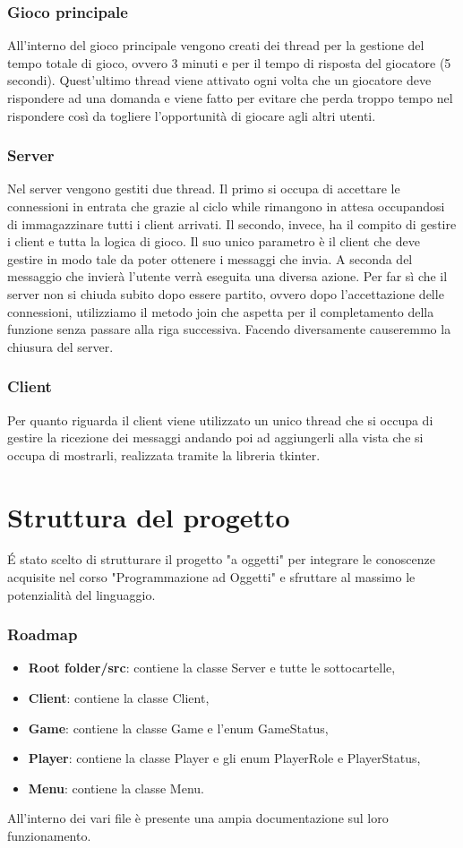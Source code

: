 \documentclass[a4paper,12pt]{report}
\begin{document}
\subsection{Gioco principale}
All'interno del gioco principale vengono creati dei thread per la gestione del tempo totale di gioco, ovvero 3 minuti e per il tempo di risposta del giocatore (5 secondi). Quest'ultimo thread viene attivato ogni volta che un giocatore deve rispondere ad una domanda e viene fatto per evitare che perda troppo tempo nel rispondere così da togliere l'opportunità di giocare agli altri utenti.

\subsection{Server}
Nel server vengono gestiti due thread. Il primo si occupa di accettare le connessioni in entrata che grazie al ciclo while rimangono in attesa occupandosi di immagazzinare tutti i client arrivati. Il secondo, invece, ha il compito di gestire i client e tutta la logica di gioco. Il suo unico parametro è il client che deve gestire in modo tale da poter ottenere i messaggi che invia. A seconda del messaggio che invierà l'utente verrà eseguita una diversa azione.
Per far sì che il server non si chiuda subito dopo essere partito, ovvero dopo l'accettazione delle connessioni, utilizziamo il metodo join che aspetta per il completamento della funzione senza passare alla riga successiva. Facendo diversamente causeremmo la chiusura del server.

\subsection{Client}
Per quanto riguarda il client viene utilizzato un unico thread che si occupa di gestire la ricezione dei messaggi andando poi ad aggiungerli alla vista che si occupa di mostrarli, realizzata tramite la libreria tkinter.

\chapter{Struttura del progetto}
É stato scelto di strutturare il progetto "a oggetti" per integrare le conoscenze acquisite nel corso "Programmazione ad Oggetti" e sfruttare al massimo le potenzialità del linguaggio.

\subsection{Roadmap}
\begin{itemize}
	\item \textbf{Root folder/src}: contiene la classe Server e tutte le sottocartelle,
	\item \textbf{Client}: contiene la classe Client,
	\item \textbf{Game}: contiene la classe Game e l'enum GameStatus,
	\item \textbf{Player}: contiene la classe Player e gli enum PlayerRole e PlayerStatus,
	\item \textbf{Menu}: contiene la classe Menu.
\end{itemize}
All'interno dei vari file è presente una ampia documentazione sul loro funzionamento.
\end{document}
